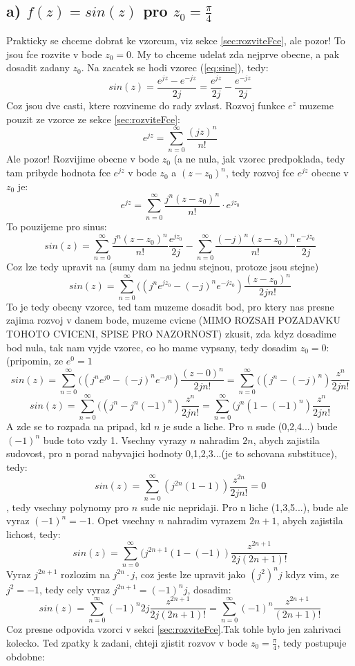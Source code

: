 \subsection*{a) $f(z) = sin(z)$ pro $z_0 = \frac{\pi}{4}$}
Prakticky se chceme dobrat ke vzorcum, viz sekce \ref{sec:rozviteFce}, ale pozor! To jsou fce rozvite v bode $z_0 = 0$. My to chceme udelat zda nejprve obecne, a pak dosadit zadany $z_0$.
Na zacatek se hodi vzorec (\ref{eq:sine}), tedy:
$$sin(z) = \frac{e^{jz}-e^{-jz}}{2j} = \frac{e^{jz}}{2j} - \frac{e^{-jz}}{2j}$$
Coz jsou dve casti, ktere rozvineme do rady zvlast. Rozvoj funkce $e^z$ muzeme pouzit ze vzorce ze sekce \ref{sec:rozviteFce}:
$$e^{jz} = \sum_{n=0}^\infty \frac{(jz)^n}{n!}$$ 
Ale pozor! Rozvijime obecne v bode $z_0$ (a ne nula, jak vzorec predpoklada, tedy tam pribyde hodnota fce $e^{jz}$ v bode $z_0$ a $(z-z_0)^n$, tedy rozvoj fce $e^{jz}$ obecne v $z_0$ je:
$$e^{jz}=\sum_{n=0}^\infty \frac{j^n(z-z_0)^n}{n!}\cdot e^{jz_0}$$
To pouzijeme pro sinus:
$$sin(z) = \sum_{n=0}^\infty \frac{j^n (z-z_0)^n}{n!}\frac{e^{jz_0}}{2j} - \sum_{n=0}^\infty \frac{(-j)^n (z-z_0)^n}{n!}\frac{e^{-jz_0}}{2j}$$
Coz lze tedy upravit na (sumy dam na jednu stejnou, protoze jsou stejne)
$$sin(z) = \sum_{n=0}^\infty ((j^n e^{jz_0} -(-j)^{n}e^{-jz_0})\frac{(z-z_0)^n}{2jn!}$$
To je tedy obecny vzorce, ted tam muzeme dosadit bod, pro ktery nas presne zajima rozvoj v danem bode, muzeme cvicne (MIMO ROZSAH POZADAVKU TOHOTO CVICENI, SPISE PRO NAZORNOST) zkusit, zda kdyz dosadime bod nula, tak nam vyjde vzorec, co ho mame vypsany, tedy dosadim $z_0 = 0$: (pripomin, ze $e^{0} =1 $
$$sin(z) =  \sum_{n=0}^\infty ((j^n e^{j0} -(-j)^{n}e^{-j0})\frac{(z-0)^n}{2jn!}=  \sum_{n=0}^\infty ((j^n -(-j)^{n})\frac{z^n}{2jn!}$$
$$sin(z) = \sum_{n=0}^\infty ((j^n -j^n(-1)^{n})\frac{z^n}{2jn!} = \sum_{n=0}^\infty (j^n(1 -(-1)^{n})\frac{z^n}{2jn!}$$
A zde se to rozpada na pripad, kd $n$ je sude a liche. Pro $n$ sude (0,2,4...) bude $(-1)^n$ bude toto vzdy 1. Vsechny vyrazy $n$ nahradim $2n$, abych zajistila sudovost, pro n porad nabyvajici hodnoty 0,1,2,3...(je to schovana substituce), tedy:
$$sin(z) = \sum_{n=0}^\infty (j^{2n}(1 -1))\frac{z^{2n}}{2jn!} = 0$$,
tedy vsechny polynomy pro $n$ sude nic nepridaji. Pro n liche (1,3,5...), bude ale vyraz $(-1)^n = -1$. Opet vsechny $n$ nahradim vyrazem $2n+1$, abych zajistila lichost, tedy:
$$sin(z) = \sum_{n=0}^\infty (j^{2n+1}(1 -(-1))\frac{z^{2n+1}}{2j(2n+1)!} $$
Vyraz $j^{2n+1}$ rozlozim na $j^{2n}\cdot j$, coz jeste lze upravit jako $(j^2)^n j$ kdyz vim, ze $j^2=-1$, tedy cely vyraz $j^{2n+1} = (-1)^n j$, dosadim:
$$sin(z) = \sum_{n=0}^\infty (-1)^n 2 j \frac{z^{2n+1}}{2j(2n+1)!} = \sum_{n=0}^\infty (-1)^n \frac{z^{2n+1}}{(2n+1)!} $$
Coz presne odpovida vzorci v sekci \ref{sec:rozviteFce}.Tak tohle bylo jen zahrivaci kolecko. Ted zpatky k zadani, chteji zjistit rozvov v bode $z_0 = \frac{\pi}{4}$, tedy postupuje obdobne: